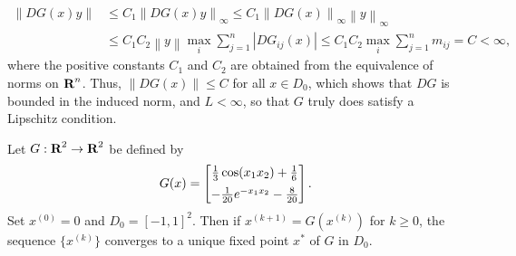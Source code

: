 \documentclass{homework}
\newcommand{\pow}[1]{^{\left(#1\right)}}
\newcommand{\norm}[1]{\left\lVert{#1}\right\rVert}
\begin{document}
	\begin{equation*}
	\begin{aligned}
		\norm{DG(x)y} &\le C_1\norm{DG(x)y}_\infty \le C_1\norm{DG(x)}_\infty \norm{y}_\infty \\
		&\le C_1C_2\norm{y} \max_{i}\sum_{j=1}^n |DG_{ij}(x)| \le C_1C_2 \max_{i}\sum_{j=1}^n m_{ij} =C < \infty,
	\end{aligned}
	\end{equation*}
	where the positive constants $C_1$ and $C_2$ are obtained from the equivalence of norms on $\textbf{R}^n$. Thus, $\norm{DG(x)} \le C$ for all $x \in D_0$, which shows that $DG$ is bounded in the induced norm, and $L < \infty$, so that $G$ truly does satisfy a Lipschitz condition.
	
	\question Let $G: \textbf{R}^2 \to \textbf{R}^2$ be defined by
	\begin{equation*}
		G(x) = \left[\begin{matrix}\frac{1}{3}\cos(x_1x_2) + \frac{1}{6} \\[0.5em] -\frac{1}{20}e^{-x_1x_2} - \frac{8}{20}\end{matrix}\right].
	\end{equation*}
	Set $x\pow{0} = 0$ and $D_0 = [-1,1]^2$. Then if $x\pow{k+1}= G\left(x\pow{k}\right)$ for $k \ge 0$, the sequence $\big\{x\pow{k}\big\}$ converges to a unique fixed point $x^*$ of $G$ in $D_0$.
\end{document}

